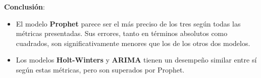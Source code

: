 \documentclass[
]{book}
\begin{document}
\textbf{Conclusión}:

\begin{itemize}
\item
  El modelo \textbf{Prophet} parece ser el más preciso de los tres según todas las métricas presentadas. Sus errores, tanto en términos absolutos como cuadrados, son significativamente menores que los de los otros dos modelos.
\item
  Los modelos \textbf{Holt-Winters} y \textbf{ARIMA} tienen un desempeño similar entre sí según estas métricas, pero son superados por Prophet.
\end{itemize}

  
\end{document}
